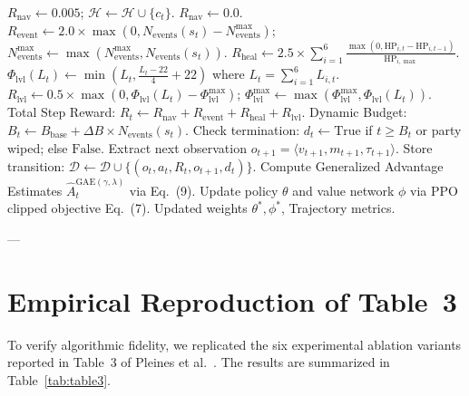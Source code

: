 \documentclass[conference]{IEEEtran}
\begin{document}
\begin{algorithm}[t]
\begin{algorithmic}[1]
        \STATE $R_{\text{nav}} \leftarrow 0.005$; \quad $\mathcal{H} \leftarrow \mathcal{H} \cup \{ c_t \}$.
    \ELSE
        \STATE $R_{\text{nav}} \leftarrow 0.0$.
    \ENDIF
    \STATE $R_{\text{event}} \leftarrow 2.0 \times \max(0, N_{\text{events}}(s_t) - N_{\text{events}}^{\max})$; \quad $N_{\text{events}}^{\max} \leftarrow \max(N_{\text{events}}^{\max}, N_{\text{events}}(s_t))$.
    \STATE $R_{\text{heal}} \leftarrow 2.5 \times \sum_{i=1}^6 \frac{\max(0, \text{HP}_{i,t} - \text{HP}_{i,t-1})}{\text{HP}_{i,\max}}$.
    \STATE $\Phi_{\text{lvl}}(L_t) \leftarrow \min(L_t, \frac{L_t - 22}{4} + 22)$ where $L_t = \sum_{i=1}^6 L_{i,t}$.
    \STATE $R_{\text{lvl}} \leftarrow 0.5 \times \max(0, \Phi_{\text{lvl}}(L_t) - \Phi_{\text{lvl}}^{\max})$; \quad $\Phi_{\text{lvl}}^{\max} \leftarrow \max(\Phi_{\text{lvl}}^{\max}, \Phi_{\text{lvl}}(L_t))$.
    \STATE Total Step Reward: $R_t \leftarrow R_{\text{nav}} + R_{\text{event}} + R_{\text{heal}} + R_{\text{lvl}}$.
    \STATE Dynamic Budget: $B_t \leftarrow B_{\text{base}} + \Delta B \times N_{\text{events}}(s_t)$.
    \STATE Check termination: $d_t \leftarrow \text{True}$ if $t \ge B_t$ or party wiped; else $\text{False}$.
    \STATE Extract next observation $o_{t+1} = \langle v_{t+1}, m_{t+1}, \tau_{t+1} \rangle$.
    \STATE Store transition: $\mathcal{D} \leftarrow \mathcal{D} \cup \{ (o_t, a_t, R_t, o_{t+1}, d_t) \}$.
\ENDFOR
\STATE Compute Generalized Advantage Estimates $\hat{A}_t^{\text{GAE}(\gamma, \lambda)}$ via Eq.~(9).
\STATE Update policy $\theta$ and value network $\phi$ via PPO clipped objective Eq.~(7).
\RETURN Updated weights $\theta^*, \phi^*$, Trajectory metrics.
\end{algorithmic}
\end{algorithm}

---

\section{Empirical Reproduction of Table~3}

To verify algorithmic fidelity, we replicated the six experimental ablation variants reported in Table~3 of Pleines et al.~\cite{pleines2025playing}. The results are summarized in Table~\ref{tab:table3}.
\end{document}
